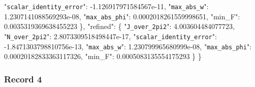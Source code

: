 \documentclass[
  10pt,
]{article}
\newenvironment{Shaded}{}{}
\newcommand{\DataTypeTok}[1]{\textcolor[rgb]{0.56,0.13,0.00}{#1}}
\newcommand{\FloatTok}[1]{\textcolor[rgb]{0.25,0.63,0.44}{#1}}
\newcommand{\FunctionTok}[1]{\textcolor[rgb]{0.02,0.16,0.49}{#1}}
\begin{document}
\begin{Shaded}
\begin{Highlighting}[]
    \DataTypeTok{"\nolinkurl{scalar_identity_error}"}\FunctionTok{:} \FloatTok{{-}1.126917971584567e{-}11}\FunctionTok{,}
    \DataTypeTok{"\nolinkurl{max_abs_w}"}\FunctionTok{:} \FloatTok{1.2307141088569293e{-}08}\FunctionTok{,}
    \DataTypeTok{"\nolinkurl{max_abs_phi}"}\FunctionTok{:} \FloatTok{0.0002018261559998651}\FunctionTok{,}
    \DataTypeTok{"min\_F"}\FunctionTok{:} \FloatTok{0.0035319369638455223}
  \FunctionTok{\},}
  \DataTypeTok{"refined"}\FunctionTok{:} \FunctionTok{\{}
    \DataTypeTok{"\nolinkurl{J_over_2pi2}"}\FunctionTok{:} \FloatTok{4.003604484077723}\FunctionTok{,}
    \DataTypeTok{"\nolinkurl{N_over_2pi2}"}\FunctionTok{:} \FloatTok{2.8073309518498447e{-}17}\FunctionTok{,}
    \DataTypeTok{"\nolinkurl{scalar_identity_error}"}\FunctionTok{:} \FloatTok{{-}1.8471303798810756e{-}13}\FunctionTok{,}
    \DataTypeTok{"\nolinkurl{max_abs_w}"}\FunctionTok{:} \FloatTok{1.230799965680999e{-}08}\FunctionTok{,}
    \DataTypeTok{"\nolinkurl{max_abs_phi}"}\FunctionTok{:} \FloatTok{0.00020182833363117326}\FunctionTok{,}
    \DataTypeTok{"min\_F"}\FunctionTok{:} \FloatTok{0.0005083135554175293}
  \FunctionTok{\}}
\FunctionTok{\}}
\end{Highlighting}
\end{Shaded}

\hypertarget{record-4-2}{%
\subsubsection{Record 4}\label{record-4-2}}
\end{document}
